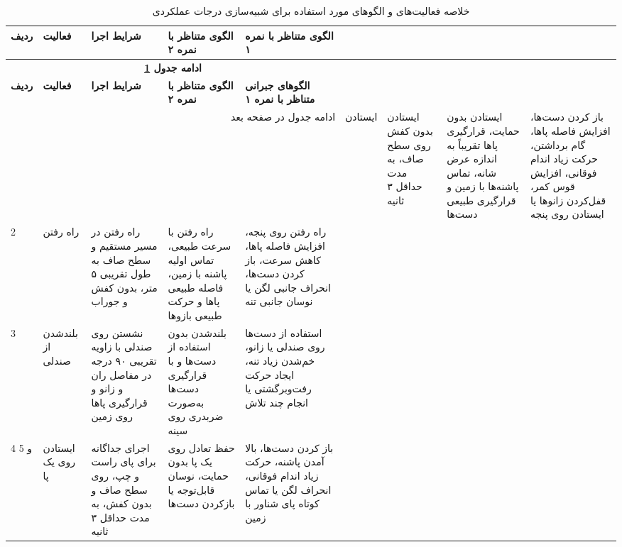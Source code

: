 	\begin{center}
		\begin{longtable}{|p{}|p{}|p{}|p{}|p{}|}
		\caption{خلاصه فعالیت‌های  و الگوهای مورد استفاده برای شبیه‌سازی درجات عملکردی}
		\label{tab:nsaa_simulation_protocol}\\
		\hline
		\textbf{ردیف} &
		\textbf{فعالیت} &
		\textbf{شرایط اجرا} &
		\textbf{الگوی متناظر با نمره ۲} &
		\textbf{الگوی متناظر با نمره ۱}
		\\
		\hline
		\endfirsthead
		
		\multicolumn{5}{c}{%
			\textbf{ادامه جدول \ref{tab:nsaa_simulation_protocol}}
		}
		\\[2pt]
		\hline
		\textbf{ردیف} &
		\textbf{فعالیت} &
		\textbf{شرایط اجرا} &
		\textbf{الگوی متناظر با نمره ۲} &
		\textbf{الگوهای جبرانی متناظر با نمره ۱}
		\\
		\hline
		\endhead
		
		\hline
		\multicolumn{5}{r}{ادامه جدول در صفحه بعد}
		\endfoot
		
		\hline
		\endlastfoot
		
		1 &
		ایستادن &
		ایستادن بدون کفش روی سطح صاف، به مدت حداقل ۳ ثانیه &
		ایستادن بدون حمایت، قرارگیری پاها تقریباً به اندازه عرض شانه، تماس پاشنه‌ها با زمین و قرارگیری طبیعی دست‌ها &
		باز کردن دست‌ها، افزایش فاصله پاها، گام برداشتن، حرکت زیاد اندام فوقانی، افزایش قوس کمر، قفل‌کردن زانوها یا ایستادن روی پنجه
		\\
		\hline
		
		2 &
		راه رفتن &
		راه رفتن در مسیر مستقیم و سطح صاف به طول تقریبی ۵ متر، بدون کفش و جوراب &
		راه رفتن با سرعت طبیعی، تماس اولیه پاشنه با زمین، فاصله طبیعی پاها و حرکت طبیعی بازوها &
		راه رفتن روی پنجه، افزایش فاصله پاها، کاهش سرعت، باز کردن دست‌ها، انحراف جانبی لگن یا نوسان جانبی تنه
		\\
		\hline
		
		3 &
		بلندشدن از صندلی &
		نشستن روی صندلی با زاویه تقریبی ۹۰ درجه در مفاصل ران و زانو و قرارگیری پاها روی زمین &
		بلندشدن بدون استفاده از دست‌ها و با قرارگیری دست‌ها به‌صورت ضربدری روی سینه &
		استفاده از دست‌ها روی صندلی یا زانو، خم‌شدن زیاد تنه، ایجاد حرکت رفت‌وبرگشتی یا انجام چند تلاش
		\\
		\hline
		
		4 و 5 &
		ایستادن روی یک پا &
		اجرای جداگانه برای پای راست و چپ، روی سطح صاف و بدون کفش، به مدت حداقل ۳ ثانیه &
		حفظ تعادل روی یک پا بدون حمایت، نوسان قابل‌توجه یا بازکردن دست‌ها &
		باز کردن دست‌ها، بالا آمدن پاشنه، حرکت زیاد اندام فوقانی، انحراف لگن یا تماس کوتاه پای شناور با زمین
		\\
		\hline
		

\end{longtable}
\end{center}
